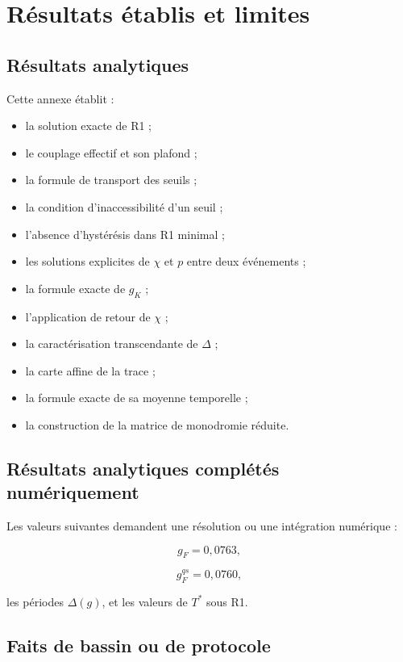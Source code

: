 \section{Résultats établis et limites}
\label{annexe-interfaces-limites}

\subsection{Résultats analytiques}

Cette annexe établit :

\begin{itemize}
\item
  la solution exacte de R1 ;
\item
  le couplage effectif et son plafond ;
\item
  la formule de transport des seuils ;
\item
  la condition d'inaccessibilité d'un seuil ;
\item
  l'absence d'hystérésis dans R1 minimal ;
\item
  les solutions explicites de \(\chi\) et \(p\) entre deux événements ;
\item
  la formule exacte de \(g_K\) ;
\item
  l'application de retour de \(\chi\) ;
\item
  la caractérisation transcendante de \(\Delta\) ;
\item
  la carte affine de la trace ;
\item
  la formule exacte de sa moyenne temporelle ;
\item
  la construction de la matrice de monodromie réduite.
\end{itemize}

\subsection{Résultats analytiques complétés numériquement}

Les valeurs suivantes demandent une résolution ou une intégration
numérique :

\[
g_F=0{,}0763,
\]

\[
g_F^{qs}=0{,}0760,
\]

les périodes \(\Delta(g)\), et les valeurs de
\(T^\ast\) sous R1.

\subsection{Faits de bassin ou de protocole}

